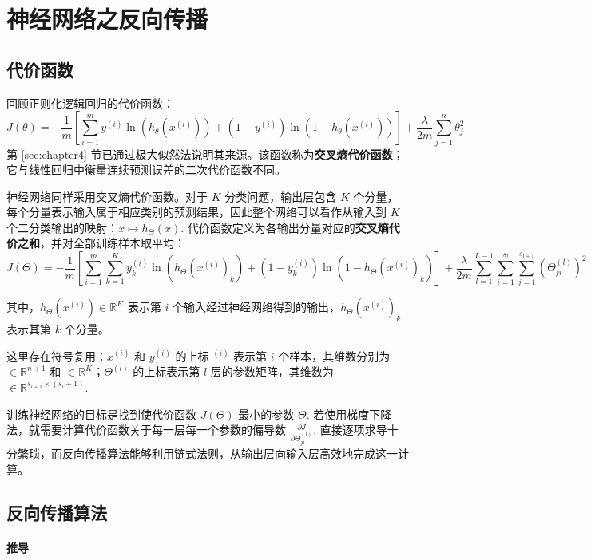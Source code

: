 \section{神经网络之反向传播}
\label{sec:chapter8}

\subsection{代价函数}

回顾正则化逻辑回归的代价函数：
\[
J(\theta)=-\frac{1}{m}\left[\sum_{i=1}^my^{(i)}\ln(h_\theta(x^{(i)}))+(1-y^{(i)})\ln(1-h_\theta(x^{(i)}))\right]+\frac{\lambda}{2m}\sum_{j=1}^n\theta_j^2
\]
第 \ref{sec:chapter4} 节已通过极大似然法说明其来源。该函数称为\textbf{交叉熵代价函数}；它与线性回归中衡量连续预测误差的二次代价函数不同。

神经网络同样采用交叉熵代价函数。对于 $K$ 分类问题，输出层包含 $K$ 个分量，每个分量表示输入属于相应类别的预测结果，因此整个网络可以看作从输入到 $K$ 个二分类输出的映射：$x\mapsto h_\Theta(x)$. 代价函数定义为各输出分量对应的\textbf{交叉熵代价之和}，并对全部训练样本取平均：
\[
J(\Theta)=-\frac{1}{m}\left[\sum_{i=1}^m\sum_{k=1}^Ky^{(i)}_k\ln\left(h_\Theta(x^{(i)})_k\right)+(1-y_k^{(i)})\ln\left(1-h_\Theta(x^{(i)})_k\right)\right]+\frac{\lambda}{2m}\sum_{l=1}^{L-1}\sum_{i=1}^{s_l}\sum_{j=1}^{s_{l+1}}\left(\Theta_{ji}^{(l)}\right)^2
\]

其中，$h_\Theta(x^{(i)})\in\mathbb R^K$ 表示第 $i$ 个输入经过神经网络得到的输出，$h_\Theta(x^{(i)})_k$ 表示其第 $k$ 个分量。

\begin{note}
这里存在符号复用：$x^{(i)}$ 和 $y^{(i)}$ 的上标 $^{(i)}$ 表示第 $i$ 个样本，其维数分别为 $\in\mathbb R^{n+1}$ 和 $\in\mathbb R^{K}$；$\Theta^{(l)}$ 的上标表示第 $l$ 层的参数矩阵，其维数为 $\in \mathbb R^{s_{l+1}\times (s_l+1)}$.
\end{note}

训练神经网络的目标是找到使代价函数 $J(\Theta)$ 最小的参数 $\Theta$. 若使用梯度下降法，就需要计算代价函数关于每一层每一个参数的偏导数 $\frac{\partial J}{\partial \Theta_{ji}^{(l)}}$. 直接逐项求导十分繁琐，而反向传播算法能够利用链式法则，从输出层向输入层高效地完成这一计算。

\subsection{反向传播算法}

\paragraph{推导}

